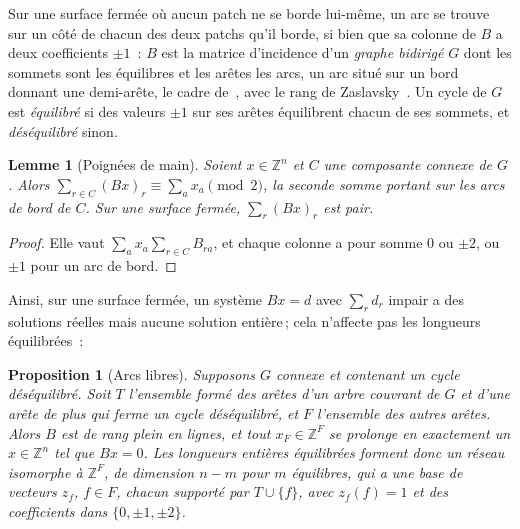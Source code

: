 \documentclass[11pt,a4paper]{article}
\newtheorem{proposition}{Proposition}
\newtheorem{lemma}{Lemme}
\newcommand{\Z}{\mathbb{Z}}
\begin{document}
Sur une surface fermée où aucun patch ne se borde lui-même, un arc se trouve
sur un côté de chacun des deux patchs qu'il borde, si bien que sa colonne de
$B$ a deux coefficients $\pm1$~: $B$ est la matrice d'incidence d'un
\emph{graphe bidirigé} $G$ dont les sommets sont les équilibres et les arêtes
les arcs, un arc situé sur un bord donnant une demi-arête, le cadre
de~\cite{heistermann2023bimdf}, avec le rang de
Zaslavsky~\cite{zaslavsky1982signed}. Un cycle de $G$ est \emph{équilibré} si
des valeurs $\pm1$ sur ses arêtes équilibrent chacun de ses sommets, et
\emph{déséquilibré} sinon.

\begin{lemma}[Poignées de main]\label{lem:handshake}
Soient $x \in \Z^n$ et $C$ une composante connexe de $G$. Alors $\sum_{r \in
C} (Bx)_r \equiv \sum_{a} x_a \pmod 2$, la seconde somme portant sur les arcs
de bord de $C$. Sur une surface fermée, $\sum_r (Bx)_r$ est pair.
\end{lemma}

\begin{proof}
Elle vaut $\sum_a x_a \sum_{r \in C} B_{ra}$, et chaque colonne a pour somme
$0$ ou $\pm2$, ou $\pm1$ pour un arc de bord.
\end{proof}

Ainsi, sur une surface fermée, un système $Bx = d$ avec $\sum_r d_r$ impair a
des solutions réelles mais aucune solution entière\,; cela n'affecte pas les
longueurs équilibrées~:

\begin{proposition}[Arcs libres]\label{prop:free}
Supposons $G$ connexe et contenant un cycle déséquilibré. Soit $T$ l'ensemble
formé des arêtes d'un arbre couvrant de $G$ et d'une arête de plus qui ferme
un cycle déséquilibré, et $F$ l'ensemble des autres arêtes. Alors $B$ est de
rang plein en lignes, et tout $x_F \in \Z^F$ se prolonge en exactement un $x
\in \Z^n$ tel que $Bx = 0$. Les longueurs entières équilibrées forment donc un
réseau isomorphe à $\Z^F$, de dimension $n - m$ pour $m$ équilibres, qui a une
base de vecteurs $z_f$, $f \in F$, chacun supporté par $T \cup \{f\}$, avec
$z_f(f) = 1$ et des coefficients dans $\{0, \pm1, \pm2\}$.
\end{proposition}
\end{document}
